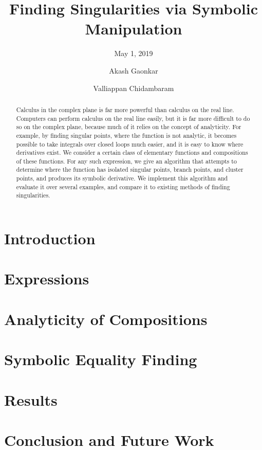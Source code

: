 \documentclass[sigplan]{acmart}
\title{Finding Singularities via Symbolic Manipulation}
\subtitle{May 1, 2019}
\author{Akash Gaonkar}
\affiliation{Undergraduate Student, \institution{University of Colorado at Boulder}}
\author{Valliappan Chidambaram}
\affiliation{Undergraduate Student, \institution{University of Colorado at Boulder}}
\theoremstyle{definition}
\begin{document}
  \begin{abstract}
		Calculus in the complex plane is far more powerful than calculus on the real line. Computers can perform calculus on the real line easily, but it is far more difficult to do so on the complex plane, because much of it relies on the concept of analyticity. For example, by finding singular points, where the function is not analytic, it becomes possible to take integrals over closed loops much easier, and it is easy to know where derivatives exist. We consider a certain class of elementary functions and compositions of these functions. For any such expression, we give an algorithm that attempts to determine where the function has isolated singular points, branch points, and cluster points, and produces its symbolic derivative. We implement this algorithm and evaluate it over several examples, and compare it to existing methods of finding singularities.
  \end{abstract}

  \maketitle

  \section{Introduction}
  \label{sec:introduction}
  

  \section{Expressions}
  \label{sec:expressions}
  

  \section{Analyticity of Compositions}
  \label{sec:analyticity}
  

  \section{Symbolic Equality Finding}
  \label{sec:rootfinding}
  

  \section{Results}
  \label{sec:results}
  

  \section{Conclusion and Future Work}
  \label{sec:conclusion}
  

  \nocite{*}
  
  
\end{document}
